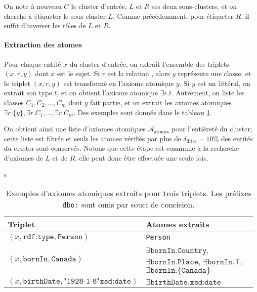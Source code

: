 On note à nouveau $C$ le cluster d'entrée,  $L$ et $R$ ses deux sous-clusters, et on cherche à étiqueter le sous-cluster $L$. Comme précédemment, pour étiqueter $R$, il suffit d'inverser les rôles de $L$ et $R$.

\paragraph{Extraction des atomes}

Pour chaque entité $x$ du cluster d'entrée, on extrait l'ensemble des triplets $(x, r, y)$ dont $x$ est le sujet. Si $r$ est la relation , alors $y$ représente une classe, et le triplet $(x, r, y)$ est transformé en l'axiome atomique $y$. Si $y$ est un littéral, on extrait son type $t$, et on obtient l'axiome atomique $\exists r.t$. Autrement, on liste les classes $C_1, C_2, \ldots, C_m$ dont $y$ fait partie, et on extrait les axiomes atomiques $\exists r.\{y\}, \exists r.C_1, \ldots, \exists r.C_m$. Des exemples sont donnés dans le tableau \ref{tab:texp-atom-examples}.

On obtient ainsi une liste d'axiomes atomiques $\mathcal{A}_\text{atomes}$ pour l'entièreté du cluster; cette liste est filtrée et seuls les atomes vérifiés par plus de $\delta_\text{filtre} = 10\%$ des entités du cluster sont conservés. Notons que cette étape est commune à la recherche d'axiomes de $L$ et de $R$, elle peut donc être effectuée une seule fois.


\begin{table}[h]
    \centering
    \caption[Extraction d'atomes atomiques à partir de triplets]{Exemples d'axiomes atomiques extraits pour trois triplets. Les préfixes \texttt{dbo:} sont omis par souci de concision.}s
    \begin{tabularx}{\textwidth}{|l|X|}
         \hline 
         Triplet & Atomes extraits \\
         \hline
         $(x, \texttt{rdf:type}, \texttt{Person})$ &  \texttt{Person} \\
         \hline 
         $(x, \texttt{bornIn}, \texttt{Canada})$ & 
         $\exists \texttt{bornIn}. \allowbreak \texttt{Country}$,  \newline
         $\exists \texttt{bornIn}. \allowbreak \texttt{Place}$, \newline
         $\exists \texttt{bornIn}. \allowbreak \top$,  \newline
         $\exists \texttt{bornIn}. \allowbreak \{\texttt{Canada} \}$ \\
         \hline 
         $(x, \texttt{birthDate}, \texttt{"1928-1-8"xsd:date})$ & $\exists \texttt{birthDate}. \allowbreak \texttt{xsd:date}$ \\
         \hline 
    \end{tabularx}
    \label{tab:texp-atom-examples}
\end{table}
